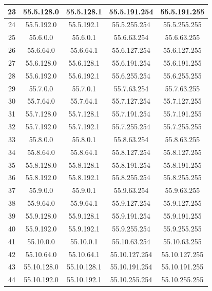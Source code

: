 \documentclass[letterpaper,12pt]{article}
\begin{document}
\begin{center}
\begin{longtable}{|c|c|c|c|c|}
                23 & 55.5.128.0 & 55.5.128.1 & 55.5.191.254 & 55.5.191.255 \\ \hline
                24 & 55.5.192.0 & 55.5.192.1 & 55.5.255.254 & 55.5.255.255 \\ \hline
                25 & 55.6.0.0 & 55.6.0.1 & 55.6.63.254 & 55.6.63.255 \\ \hline
                26 & 55.6.64.0 & 55.6.64.1 & 55.6.127.254 & 55.6.127.255 \\ \hline
                27 & 55.6.128.0 & 55.6.128.1 & 55.6.191.254 & 55.6.191.255 \\ \hline
                28 & 55.6.192.0 & 55.6.192.1 & 55.6.255.254 & 55.6.255.255 \\ \hline
                29 & 55.7.0.0 & 55.7.0.1 & 55.7.63.254 & 55.7.63.255 \\ \hline
                30 & 55.7.64.0 & 55.7.64.1 & 55.7.127.254 & 55.7.127.255 \\ \hline
                31 & 55.7.128.0 & 55.7.128.1 & 55.7.191.254 & 55.7.191.255 \\ \hline
                32 & 55.7.192.0 & 55.7.192.1 & 55.7.255.254 & 55.7.255.255 \\ \hline
                33 & 55.8.0.0 & 55.8.0.1 & 55.8.63.254 & 55.8.63.255 \\ \hline
                34 & 55.8.64.0 & 55.8.64.1 & 55.8.127.254 & 55.8.127.255 \\ \hline
                35 & 55.8.128.0 & 55.8.128.1 & 55.8.191.254 & 55.8.191.255 \\ \hline
                36 & 55.8.192.0 & 55.8.192.1 & 55.8.255.254 & 55.8.255.255 \\ \hline
                37 & 55.9.0.0 & 55.9.0.1 & 55.9.63.254 & 55.9.63.255 \\ \hline
                38 & 55.9.64.0 & 55.9.64.1 & 55.9.127.254 & 55.9.127.255 \\ \hline
                39 & 55.9.128.0 & 55.9.128.1 & 55.9.191.254 & 55.9.191.255 \\ \hline
                40 & 55.9.192.0 & 55.9.192.1 & 55.9.255.254 & 55.9.255.255 \\ \hline
                41 & 55.10.0.0 & 55.10.0.1 & 55.10.63.254 & 55.10.63.255 \\ \hline
                42 & 55.10.64.0 & 55.10.64.1 & 55.10.127.254 & 55.10.127.255 \\ \hline
                43 & 55.10.128.0 & 55.10.128.1 & 55.10.191.254 & 55.10.191.255 \\ \hline
                44 & 55.10.192.0 & 55.10.192.1 & 55.10.255.254 & 55.10.255.255 \\ \hline

\end{longtable}
\end{center}
\end{document}
